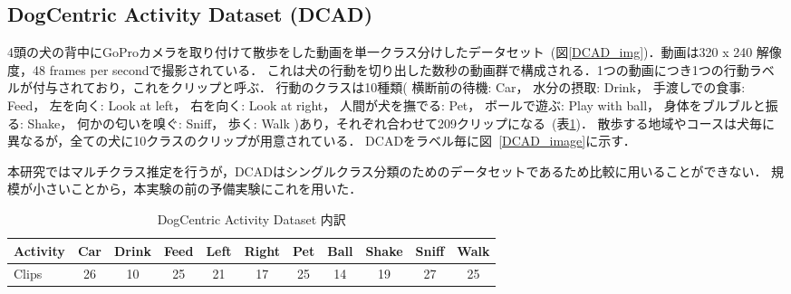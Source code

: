 \begin{enumerate}
\begin{end}
\section{DogCentric Activity Dataset (DCAD)}
4頭の犬の背中にGoProカメラを取り付けて散歩をした動画を単一クラス分けしたデータセット~(図\ref{DCAD_img})．動画は320 x 240 解像度，48 frames per secondで撮影されている．
これは犬の行動を切り出した数秒の動画群で構成される．1つの動画につき1つの行動ラベルが付与されており，これをクリップと呼ぶ．
行動のクラスは10種類(
横断前の待機: Car， 水分の摂取: Drink， 手渡しでの食事: Feed， 左を向く: Look at left， 右を向く: Look at right， 人間が犬を撫でる: Pet， ボールで遊ぶ: Play with ball， 身体をブルブルと振る: Shake， 何かの匂いを嗅ぐ: Sniff， 歩く: Walk
)あり，それぞれ合わせて209クリップになる~(表\ref{DCADlabel})．
散歩する地域やコースは犬毎に異なるが，全ての犬に10クラスのクリップが用意されている．
DCADをラベル毎に図~\ref{DCAD_image}に示す．

本研究ではマルチクラス推定を行うが，DCADはシングルクラス分類のためのデータセットであるため比較に用いることができない．
規模が小さいことから，本実験の前の予備実験にこれを用いた．
\begin{table}[tb]
 \centering
 \caption{DogCentric Activity Dataset 内訳}\label{DCADlabel}
  \begin{tabular}{|l||c|c|c|c|c|c|c|c|c|c|}
   \hline \hline
   Activity& Car &Drink& Feed& Left&Right& Pet & Ball&Shake&Sniff&Walk \\ \hline
   Clips   &   26&   10&   25&   21&   17&   25&   14&   19&   27&   25\\ \hline
  \end{tabular}

\end{table}


\end{end}
\end{enumerate}
